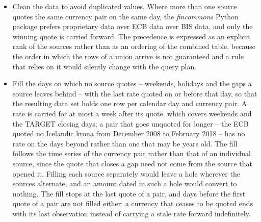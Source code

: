\begin{itemize}
	The latest date of every source is logged, and with it the date the data set is cut back to, so that a source that has fallen behind is visible.
	\item Clean the data to avoid duplicated values. Where more than one source quotes the same currency pair on the same day, the \emph{fincommons} Python package prefers proprietary data over ECB data over BIS data, and only the winning quote is carried forward. The precedence is expressed as an explicit rank of the sources rather than as an ordering of the combined table, because the order in which the rows of a union arrive is not guaranteed and a rule that relies on it would silently change with the query plan.
	\item Fill the days on which no source quotes -- weekends, holidays and the gaps a source leaves behind -- with the last rate quoted on or before that day, so that the resulting data set holds one row per calendar day and currency pair. A rate is carried for at most a week after its quote, which covers weekends and the TARGET closing days; a pair that goes unquoted for longer -- the ECB quoted no Icelandic krona from December 2008 to February 2018 -- has no rate on the days beyond rather than one that may be years old. The fill follows the time series of the currency pair rather than that of an individual source, since the quote that closes a gap need not come from the source that opened it. Filling each source separately would leave a hole wherever the sources alternate, and an amount dated in such a hole would convert to nothing. The fill stops at the last quote of a pair, and days before the first quote of a pair are not filled either: a currency that ceases to be quoted ends with its last observation instead of carrying a stale rate forward indefinitely.


\end{itemize}
